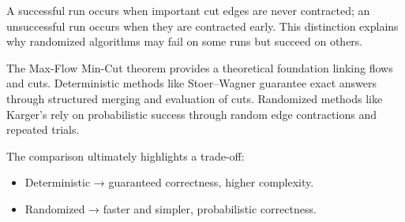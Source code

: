 \documentclass[12pt]{article}
\begin{document}
A successful run occurs when important cut edges are never contracted; an unsuccessful run occurs when they are contracted early. This distinction explains why randomized algorithms may fail on some runs but succeed on others.

The Max-Flow Min-Cut theorem provides a theoretical foundation linking flows and cuts. Deterministic methods like Stoer–Wagner guarantee exact answers through structured merging and evaluation of cuts. Randomized methods like Karger’s rely on probabilistic success through random edge contractions and repeated trials.

The comparison ultimately highlights a trade-off:
\begin{itemize}
\item Deterministic → guaranteed correctness, higher complexity.
\item Randomized → faster and simpler, probabilistic correctness.
\end{itemize}
\end{document}
